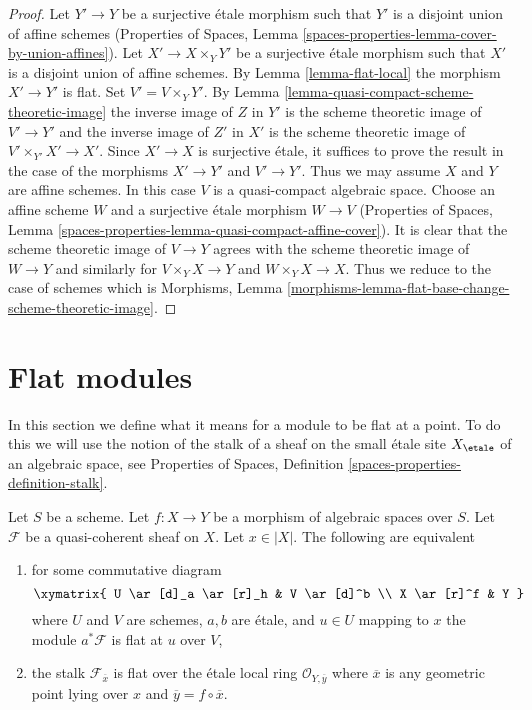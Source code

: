 \begin{proof}
Let $Y' \to Y$ be a surjective \'etale morphism such that $Y'$ is a
disjoint union of affine schemes (Properties of Spaces,
Lemma \ref{spaces-properties-lemma-cover-by-union-affines}).
Let $X' \to X \times_Y Y'$ be a surjective \'etale morphism such
that $X'$ is a disjoint union of affine schemes.
By Lemma \ref{lemma-flat-local} the morphism $X' \to Y'$ is flat.
Set $V' = V \times_Y Y'$.
By Lemma \ref{lemma-quasi-compact-scheme-theoretic-image}
the inverse image of $Z$ in $Y'$ is the scheme theoretic
image of $V' \to Y'$ and the inverse image of $Z'$ in $X'$
is the scheme theoretic image of $V' \times_{Y'} X' \to X'$.
Since $X' \to X$ is surjective \'etale, it suffices to prove
the result in the case of the morphisms $X' \to Y'$ and $V' \to Y'$.
Thus we may assume $X$ and $Y$ are affine schemes.
In this case $V$ is a quasi-compact algebraic space.
Choose an affine scheme $W$ and a surjective \'etale morphism
$W \to V$ (Properties of Spaces, Lemma
\ref{spaces-properties-lemma-quasi-compact-affine-cover}).
It is clear that the scheme theoretic image of $V \to Y$
agrees with the scheme theoretic image of $W \to Y$ and
similarly for $V \times_Y X \to Y$ and $W \times_Y X \to X$.
Thus we reduce to the case of schemes which is
Morphisms, Lemma
\ref{morphisms-lemma-flat-base-change-scheme-theoretic-image}.
\end{proof}





\section{Flat modules}
\label{section-flat-modules}

\noindent
In this section we define what it means for a module to be flat at
a point. To do this we will use the notion of the stalk of a sheaf on
the small \'etale site $X_\etale$ of an algebraic space, see
Properties of Spaces, Definition \ref{spaces-properties-definition-stalk}.

\begin{lemma}
\label{lemma-flat-at-point}
Let $S$ be a scheme. Let $f : X \to Y$ be a morphism of algebraic
spaces over $S$. Let $\mathcal{F}$ be a quasi-coherent sheaf on $X$.
Let $x \in |X|$. The following are equivalent
\begin{enumerate}
\item for some commutative diagram
$$
\xymatrix{
U \ar[d]_a \ar[r]_h & V \ar[d]^b \\
X \ar[r]^f & Y
}
$$
where $U$ and $V$ are schemes, $a, b$ are \'etale, and
$u \in U$ mapping to $x$ the module $a^*\mathcal{F}$ is flat at $u$ over $V$,
\item the stalk $\mathcal{F}_{\overline{x}}$ is flat over
the \'etale local ring $\mathcal{O}_{Y, \overline{y}}$
where $\overline{x}$ is any geometric point lying over
$x$ and $\overline{y} = f \circ \overline{x}$.
\end{enumerate}
\end{lemma}

